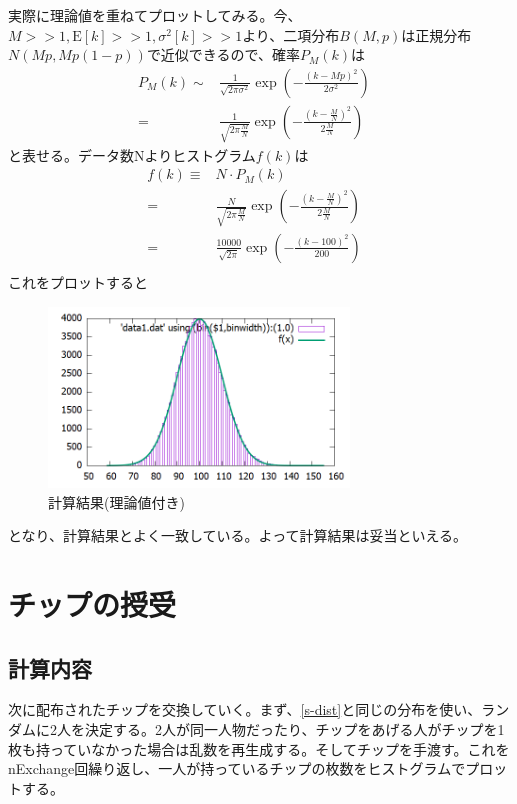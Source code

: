 \documentclass[ %
  platex,%
  papersize,%
  twocolumn,
  landscape
]{jsarticle}
\begin{document}
実際に理論値を重ねてプロットしてみる。今、$M>>1,\textrm{E}[k]>>1,\sigma^{2}[k]>>1$より、二項分布$B(M,p)$は正規分布$N\left(Mp,Mp(1-p)\right)$で近似できるので、確率$P_M(k)$は
\begin{align}
  P_M(k)\sim&\frac{1}{\sqrt{2\pi\sigma^2}}\exp\left(-\frac{(k-Mp)^2}{2\sigma^2}\right)&\\
  =&\frac{1}{\sqrt{2\pi\frac{M}{N}}}\exp\left({-\frac{(k-\frac{M}{N})^2}{2\frac{M}{N}}}\right)&
\end{align}
と表せる。データ数Nよりヒストグラム$f(k)$は
\begin{align}
  f(k)\equiv&N\cdot P_M(k)&\\
  =&\frac{N}{\sqrt{2\pi\frac{M}{N}}}\exp\left({-\frac{(k-\frac{M}{N})^2}{2\frac{M}{N}}}\right)&\\
  =&\frac{10000}{\sqrt{2\pi}}\exp\left(-\frac{(k-100)^2}{200}\right)&\\
\end{align}
これをプロットすると
\begin{figure}[H]
\begin{center}
\includegraphics[width=8cm]{../cpp/out/dice_game/data1_with_theory.png}
\end{center}
\caption{計算結果(理論値付き)}
\end{figure}
となり、計算結果とよく一致している。よって計算結果は妥当といえる。

\section{チップの授受}\label{s-exchange}
\subsection{計算内容}
次に配布されたチップを交換していく。まず、\ref{s-dist}と同じの分布を使い、ランダムに2人を決定する。2人が同一人物だったり、チップをあげる人がチップを1枚も持っていなかった場合は乱数を再生成する。そしてチップを手渡す。これをnExchange回繰り返し、一人が持っているチップの枚数をヒストグラムでプロットする。
\end{document}
